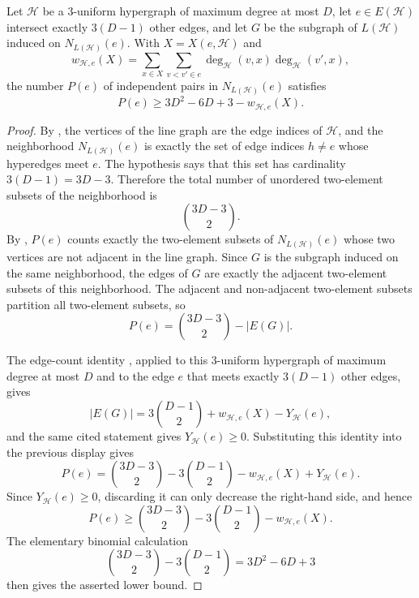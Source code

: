 \begin{lemma}
Let $\mathcal H$ be a $3$-uniform hypergraph of maximum degree at most $D$,
let $e\in E(\mathcal H)$ intersect exactly $3(D-1)$ other edges, and let $G$
be the subgraph of $L(\mathcal H)$ induced on $N_{L(\mathcal H)}(e)$.  With
$X=X(e,\mathcal H)$ and
\[
w_{\mathcal H,e}(X)=
\sum_{x\in X}\sum_{v<v'\in e}
\deg_{\mathcal H}(v,x)\deg_{\mathcal H}(v',x),
\]
the number $P(e)$ of independent pairs in $N_{L(\mathcal H)}(e)$ satisfies
\[
P(e)\ge 3D^2-6D+3-w_{\mathcal H,e}(X).
\]
\end{lemma}
\begin{proof}
By , the vertices of the line graph are the
edge indices of $\mathcal H$, and the neighborhood $N_{L(\mathcal H)}(e)$ is
exactly the set of edge indices $h\ne e$ whose hyperedges meet $e$.  The
hypothesis says that this set has cardinality $3(D-1)=3D-3$.  Therefore the
total number of unordered two-element subsets of the neighborhood is
\[
\binom{3D-3}{2}.
\]
By , $P(e)$ counts exactly the two-element
subsets of $N_{L(\mathcal H)}(e)$ whose two vertices are not adjacent in the
line graph.  Since $G$ is the subgraph induced on the same neighborhood, the
edges of $G$ are exactly the adjacent two-element subsets of this
neighborhood.  The adjacent and non-adjacent two-element subsets partition
all two-element subsets, so
\[
P(e)=\binom{3D-3}{2}-|E(G)|.
\]

The edge-count identity , applied to
this $3$-uniform hypergraph of maximum degree at most $D$ and to the edge
$e$ that meets exactly $3(D-1)$ other edges, gives
\[
|E(G)|=3\binom{D-1}{2}+w_{\mathcal H,e}(X)-Y_{\mathcal H}(e),
\]
and the same cited statement gives $Y_{\mathcal H}(e)\ge0$.  Substituting
this identity into the previous display gives
\[
P(e)=
\binom{3D-3}{2}
-3\binom{D-1}{2}
-w_{\mathcal H,e}(X)+Y_{\mathcal H}(e).
\]
Since $Y_{\mathcal H}(e)\ge0$, discarding it can only decrease the
right-hand side, and hence
\[
P(e)\ge
\binom{3D-3}{2}-3\binom{D-1}{2}-w_{\mathcal H,e}(X).
\]
The elementary binomial calculation
\[
\binom{3D-3}{2}-3\binom{D-1}{2}=3D^2-6D+3
\]
then gives the asserted lower bound.
\end{proof}
